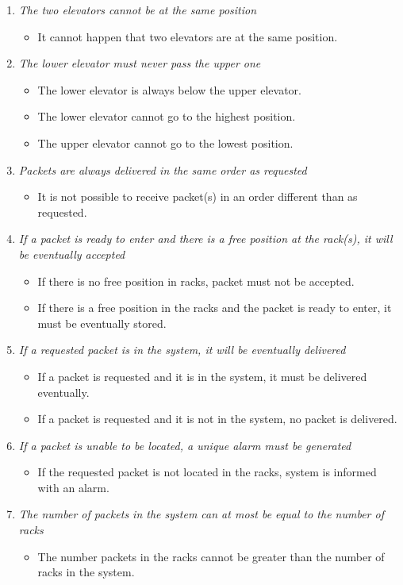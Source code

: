 \begin{enumerate}
\item \textit{The two elevators cannot be at the same position}
	\begin{itemize}
	\item  It cannot happen that two elevators are at the same 
	position.
	\end{itemize}	
	
\item \textit{The lower elevator must never pass the upper one}
	\begin{itemize}
	\item The lower elevator is always below the upper elevator.
	\item The lower elevator cannot go to the highest position.
	\item The upper elevator cannot go to the lowest position.
	\end{itemize}
	
\item \textit{Packets are always delivered in the same order as
	requested}	
	\begin{itemize}
	\item It is not possible to receive packet(s) in an order different
	than as requested.
	\end{itemize}
	
\item \textit{If a packet is ready to enter and there is a free
	position at the rack(s), it will be eventually accepted}
	\begin{itemize}
	\item If there is no free position in racks, packet must not be 
	accepted.
	\item If there is a free position in the racks and the packet is 
	ready to enter, it must be eventually stored.
	\end{itemize}
	
\item \textit{If a requested packet is in the system, it will be
	eventually delivered}
	\begin{itemize}
	\item If a packet is requested and it is in the system, it must be
	delivered eventually.
	\item If a packet is requested and it is not in the system, no 
	packet is delivered.
	\end{itemize}
	
\item \textit{If a packet is unable to be located, a unique alarm must 
	be generated}
	\begin{itemize}	
	\item If the requested packet is not located in the racks, system
	is informed with an alarm.
	\end{itemize}
		
\item \textit{The number of packets in the system can at most be equal to the number of racks}
	\begin{itemize}
	\item The number packets in the racks cannot be greater than the 
	number of racks in the system.
	\end{itemize}
\end{enumerate}
